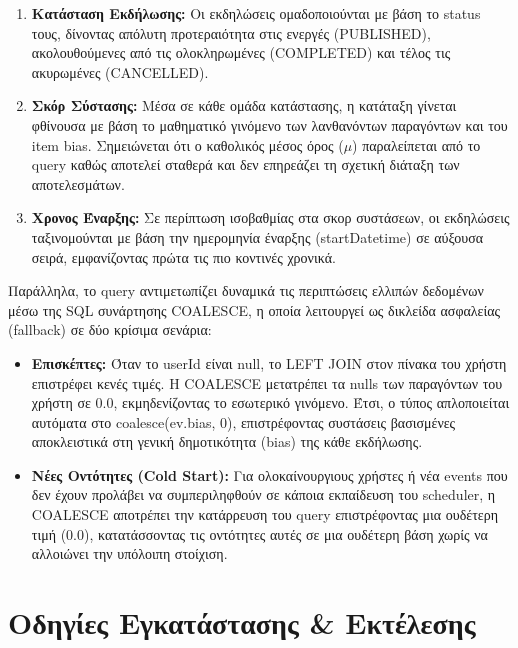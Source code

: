 \documentclass[12pt]{fphw}
\newcommand{\en}[1]{\foreignlanguage{english}{#1}}
\begin{document}
\begin{enumerate}[leftmargin=*]
    \item \textbf{Κατάσταση Εκδήλωσης:} Οι εκδηλώσεις ομαδοποιούνται με βάση το status τους, δίνοντας απόλυτη προτεραιότητα στις ενεργές (\en{PUBLISHED}), ακολουθούμενες από τις ολοκληρωμένες (\en{COMPLETED}) και τέλος τις ακυρωμένες (\en{CANCELLED}).
    \item \textbf{Σκόρ Σύστασης:} Μέσα σε κάθε ομάδα κατάστασης, η κατάταξη γίνεται φθίνουσα με βάση το μαθηματικό γινόμενο των λανθανόντων παραγόντων και του item bias. Σημειώνεται ότι ο καθολικός μέσος όρος ($\mu$) παραλείπεται από το query καθώς αποτελεί σταθερά και δεν επηρεάζει τη σχετική διάταξη των αποτελεσμάτων.
    \item \textbf{Χρονος Έναρξης:} Σε περίπτωση ισοβαθμίας στα σκορ συστάσεων, οι εκδηλώσεις ταξινομούνται με βάση την ημερομηνία έναρξης (\en{startDatetime}) σε αύξουσα σειρά, εμφανίζοντας πρώτα τις πιο κοντινές χρονικά.
\end{enumerate}

Παράλληλα, το query αντιμετωπίζει δυναμικά τις περιπτώσεις ελλιπών δεδομένων μέσω της SQL συνάρτησης \en{COALESCE}, η οποία λειτουργεί ως δικλείδα ασφαλείας (\en{fallback}) σε δύο κρίσιμα σενάρια:
\begin{itemize}[leftmargin=*]
    \item \textbf{Επισκέπτες:} Όταν το \en{userId} είναι \en{null}, το \en{LEFT JOIN} στον πίνακα του χρήστη επιστρέφει κενές τιμές. Η \en{COALESCE} μετατρέπει τα \en{nulls} των παραγόντων του χρήστη σε 0.0, εκμηδενίζοντας το εσωτερικό γινόμενο. Έτσι, ο τύπος απλοποιείται αυτόματα στο \en{coalesce(ev.bias, 0)}, επιστρέφοντας συστάσεις βασισμένες αποκλειστικά στη γενική δημοτικότητα (bias) της κάθε εκδήλωσης.
    \item \textbf{Νέες Οντότητες (\en{Cold Start}):} Για ολοκαίνουργιους χρήστες ή νέα events που δεν έχουν προλάβει να συμπεριληφθούν σε κάποια εκπαίδευση του scheduler, η \en{COALESCE} αποτρέπει την κατάρρευση του query επιστρέφοντας μια ουδέτερη τιμή (0.0), κατατάσσοντας τις οντότητες αυτές σε μια ουδέτερη βάση χωρίς να αλλοιώνει την υπόλοιπη στοίχιση.
\end{itemize}


\newpage

\section{Οδηγίες Εγκατάστασης \& Εκτέλεσης}
\end{document}
